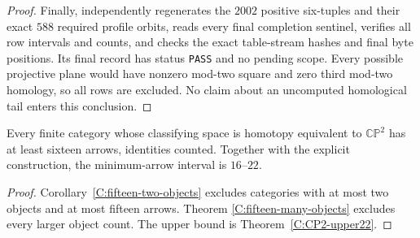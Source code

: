 \begin{proof}
Finally, 
independently regenerates the $2002$ positive six-tuples and
their exact $588$ required profile orbits, reads every final
completion sentinel, verifies all row intervals and counts,
and checks the exact table-stream hashes and final byte
positions.  Its final record
 has status
\texttt{PASS} and no pending scope.  Every possible projective
plane would have nonzero mod-two square and zero third
mod-two homology, so all rows are excluded.  No claim about
an uncomputed homological tail enters this conclusion.
\end{proof}

\begin{theorem}
\label{C:CP2-lower16}
Every finite category whose classifying space is homotopy
equivalent to $\mathbb {CP}^2$ has at least sixteen arrows,
identities counted.  Together with the explicit construction,
the minimum-arrow interval is $16$--$22$.
\end{theorem}
\begin{proof}
Corollary~\ref{C:fifteen-two-objects} excludes categories with
at most two objects and at most fifteen arrows.  Theorem
\ref{C:fifteen-many-objects} excludes every larger object
count.  The upper bound is Theorem~\ref{C:CP2-upper22}.
\end{proof}
